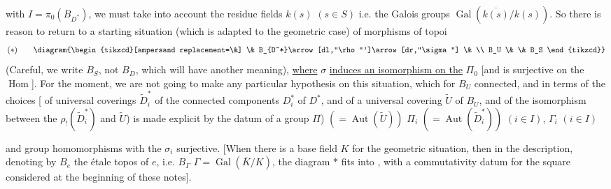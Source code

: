 with $I=\pi_0(B_{D^*})$, we must take into account the residue fields $k(s)$ $(s\in S)$ i.e. the Galois groups $\operatorname{Gal}(\overline{k(s)}/k(s))$. So there is reason to return to a starting situation (which is adapted to the geometric case) of morphisms of  topoi
\[
 (*)\qquad
 \diagram{\begin{tikzcd}[ampersand replacement=\&]
 \& B_{D^*}\arrow[dl,"\rho"']\arrow[dr,"\sigma"] \& \\
 B_U \& \& B_S
 \end{tikzcd}}
\]
(Careful, we write $B_S$, not $B_D$, which will have another meaning), \uline{where} $\sigma$ \uline{induces an isomorphism on the} $\Pi_0$ [and is surjective on the $\operatorname{Hom}$]. For the moment, we are not going to make any particular hypothesis on this situation, which for $B_U$ connected, and in terms of the choices
[ of universal coverings $\widetilde D_i^*$ of the connected components $D_i^*$ of $D^*$, and of a universal covering $\widetilde U$ of $B_U$, and of the isomorphism between the $\rho_!(\widetilde D_i^*)$ and $\widetilde U$) is made explicit by the datum of a group  $\Pi$) $(=\operatorname{Aut}(\widetilde U))$   $\Pi_i$ $(=\operatorname{Aut}(\widetilde D_i^*))$  $(i\in I)$, $\Gamma_i$ $(i\in I)$


and group homomorphisms
with the $\sigma_i$ surjective. 
[When there is a base field $K$ for the geometric situation, then in the  description,  denoting by $B_e$ the étale topos  of $e$, i.e. $B_\Gamma$  $\Gamma=\operatorname{Gal}(\overline K/K)$, the diagram $*$ fits into
,
with a commutativity datum for the square considered at the beginning of these notes].

